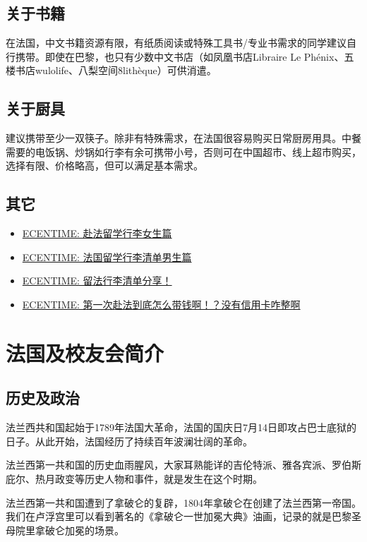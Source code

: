 \documentclass[UTF8]{ctexart}
\begin{document}
\subsection{关于书籍}

在法国，中文书籍资源有限，有纸质阅读或特殊工具书/专业书需求的同学建议自行携带。即使在巴黎，也只有少数中文书店（如凤凰书店Libraire Le Phénix、五楼书店wulolife、八梨空间8lithèque）可供消遣。

\subsection{关于厨具}
建议携带至少一双筷子。除非有特殊需求，在法国很容易购买日常厨房用具。中餐需要的电饭锅、炒锅如行李有余可携带小号，否则可在中国超市、线上超市购买，选择有限、价格略高，但可以满足基本需求。

\subsection{其它}
\begin{itemize}
    \item \href{https://www.ecentime.com/article/nvshengqingdan}{ECENTIME: 赴法留学行李女生篇}
    \item \href{https://www.ecentime.com/article/nanshengqingdan}{ECENTIME: 法国留学行李清单男生篇}
    \item \href{https://www.ecentime.com/article/qingdan}{ECENTIME: 留法行李清单分享！}
    \item \href{https://www.ecentime.com/article/daiqian}{ECENTIME: 第一次赴法到底怎么带钱啊！？没有信用卡咋整啊}
\end{itemize}

\newpage
\section{法国及校友会简介}
\subsection{历史及政治}

法兰西共和国起始于1789年法国大革命，法国的国庆日7月14日即攻占巴士底狱的日子。从此开始，法国经历了持续百年波澜壮阔的革命。

法兰西第一共和国的历史血雨腥风，大家耳熟能详的吉伦特派、雅各宾派、罗伯斯庇尔、热月政变等历史人物和事件，就是发生在这个时期。

法兰西第一共和国遭到了拿破仑的复辟，1804年拿破仑在创建了法兰西第一帝国。我们在卢浮宫里可以看到著名的《拿破仑一世加冕大典》油画，记录的就是巴黎圣母院里拿破仑加冕的场景。
\end{document}
